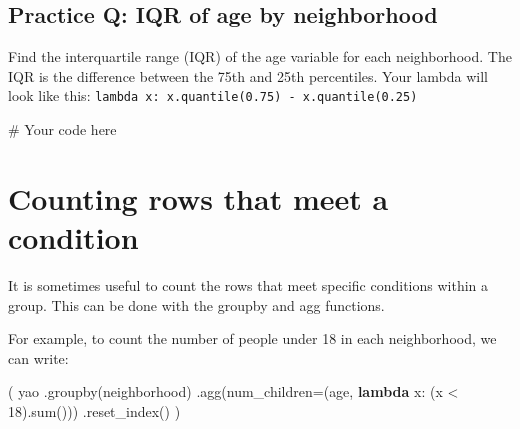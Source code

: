 \documentclass[
  letterpaper,
  DIV=11,
  numbers=noendperiod]{scrreprt}
\newenvironment{Shaded}{\begin{snugshade}}{\end{snugshade}}
\newcommand{\BuiltInTok}[1]{\textcolor[rgb]{0.00,0.23,0.31}{#1}}
\newcommand{\CommentTok}[1]{\textcolor[rgb]{0.37,0.37,0.37}{#1}}
\newcommand{\DecValTok}[1]{\textcolor[rgb]{0.68,0.00,0.00}{#1}}
\newcommand{\KeywordTok}[1]{\textcolor[rgb]{0.00,0.23,0.31}{\textbf{#1}}}
\newcommand{\NormalTok}[1]{\textcolor[rgb]{0.00,0.23,0.31}{#1}}
\newcommand{\OperatorTok}[1]{\textcolor[rgb]{0.37,0.37,0.37}{#1}}
\newcommand{\StringTok}[1]{\textcolor[rgb]{0.13,0.47,0.30}{#1}}
\begin{document}
\begin{tcolorbox}[enhanced jigsaw, colframe=quarto-callout-tip-color-frame, opacityback=0, titlerule=0mm, bottomrule=.15mm, breakable, leftrule=.75mm, colbacktitle=quarto-callout-tip-color!10!white, title=\textcolor{quarto-callout-tip-color}{\faLightbulb}\hspace{0.5em}{Practice}, rightrule=.15mm, coltitle=black, opacitybacktitle=0.6, colback=white, left=2mm, arc=.35mm, toptitle=1mm, bottomtitle=1mm, toprule=.15mm]

\subsection{Practice Q: IQR of age by
neighborhood}\label{practice-q-iqr-of-age-by-neighborhood}

Find the interquartile range (IQR) of the age variable for each
neighborhood. The IQR is the difference between the 75th and 25th
percentiles. Your lambda will look like this:
\texttt{lambda\ x:\ x.quantile(0.75)\ -\ x.quantile(0.25)}

\begin{Shaded}
\begin{Highlighting}[]
\CommentTok{\# Your code here}
\end{Highlighting}
\end{Shaded}

\end{tcolorbox}

\section{Counting rows that meet a
condition}\label{counting-rows-that-meet-a-condition}

It is sometimes useful to count the rows that meet specific conditions
within a group. This can be done with the groupby and agg functions.

For example, to count the number of people under 18 in each
neighborhood, we can write:

\begin{Shaded}
\begin{Highlighting}[]
\NormalTok{(}
\NormalTok{    yao}
\NormalTok{    .groupby(}\StringTok{\textquotesingle{}neighborhood\textquotesingle{}}\NormalTok{)}
\NormalTok{    .agg(num\_children}\OperatorTok{=}\NormalTok{(}\StringTok{\textquotesingle{}age\textquotesingle{}}\NormalTok{, }\KeywordTok{lambda}\NormalTok{ x: (x }\OperatorTok{\textless{}} \DecValTok{18}\NormalTok{).}\BuiltInTok{sum}\NormalTok{()))}
\NormalTok{    .reset\_index()}
\NormalTok{)}
\end{Highlighting}
\end{Shaded}
\end{document}
